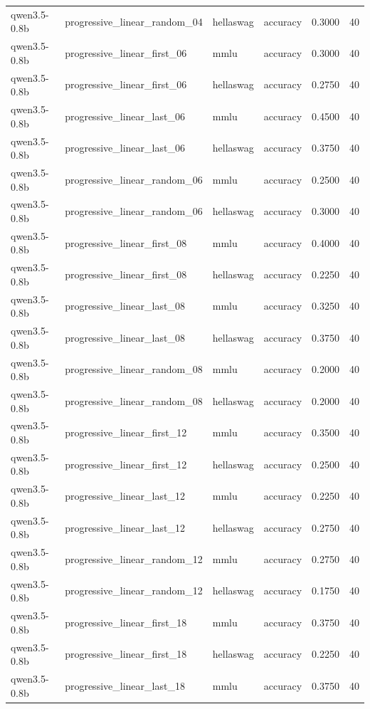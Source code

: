 \begin{tabular}{llllrr}
qwen3.5-0.8b & progressive_linear_random_04 & hellaswag & accuracy & 0.3000 & 40 \\
qwen3.5-0.8b & progressive_linear_first_06 & mmlu & accuracy & 0.3000 & 40 \\
qwen3.5-0.8b & progressive_linear_first_06 & hellaswag & accuracy & 0.2750 & 40 \\
qwen3.5-0.8b & progressive_linear_last_06 & mmlu & accuracy & 0.4500 & 40 \\
qwen3.5-0.8b & progressive_linear_last_06 & hellaswag & accuracy & 0.3750 & 40 \\
qwen3.5-0.8b & progressive_linear_random_06 & mmlu & accuracy & 0.2500 & 40 \\
qwen3.5-0.8b & progressive_linear_random_06 & hellaswag & accuracy & 0.3000 & 40 \\
qwen3.5-0.8b & progressive_linear_first_08 & mmlu & accuracy & 0.4000 & 40 \\
qwen3.5-0.8b & progressive_linear_first_08 & hellaswag & accuracy & 0.2250 & 40 \\
qwen3.5-0.8b & progressive_linear_last_08 & mmlu & accuracy & 0.3250 & 40 \\
qwen3.5-0.8b & progressive_linear_last_08 & hellaswag & accuracy & 0.3750 & 40 \\
qwen3.5-0.8b & progressive_linear_random_08 & mmlu & accuracy & 0.2000 & 40 \\
qwen3.5-0.8b & progressive_linear_random_08 & hellaswag & accuracy & 0.2000 & 40 \\
qwen3.5-0.8b & progressive_linear_first_12 & mmlu & accuracy & 0.3500 & 40 \\
qwen3.5-0.8b & progressive_linear_first_12 & hellaswag & accuracy & 0.2500 & 40 \\
qwen3.5-0.8b & progressive_linear_last_12 & mmlu & accuracy & 0.2250 & 40 \\
qwen3.5-0.8b & progressive_linear_last_12 & hellaswag & accuracy & 0.2750 & 40 \\
qwen3.5-0.8b & progressive_linear_random_12 & mmlu & accuracy & 0.2750 & 40 \\
qwen3.5-0.8b & progressive_linear_random_12 & hellaswag & accuracy & 0.1750 & 40 \\
qwen3.5-0.8b & progressive_linear_first_18 & mmlu & accuracy & 0.3750 & 40 \\
qwen3.5-0.8b & progressive_linear_first_18 & hellaswag & accuracy & 0.2250 & 40 \\
qwen3.5-0.8b & progressive_linear_last_18 & mmlu & accuracy & 0.3750 & 40 \\

\end{tabular}
